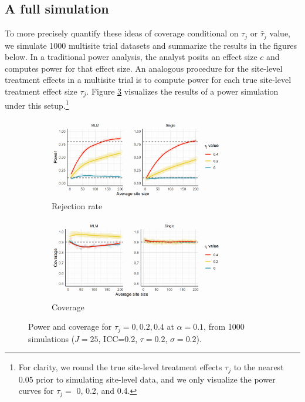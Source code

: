 \documentclass[]{article}
\begin{document}
\subsection{A full simulation}

To more precisely quantify these ideas of coverage conditional on $\tau_j$ or $\hat{\tau}_j$ value, we simulate 1000 multisite trial datasets and summarize the results in the figures below.
In a traditional power analysis, the analyst posits an effect size $c$ and computes power for that effect size.
An analogous procedure for the site-level treatment effects in a multisite trial is to compute power for each true site-level treatment effect size $\tau_j$.
Figure \ref{fig:pcp1} visualizes the results of a power simulation under this setup.\footnote{For clarity, we round the true site-level treatment effects $\tau_j$ to the nearest 0.05 prior to simulating site-level data, and we only visualize the power curves for $\tau_j =$ 0, 0.2, and 0.4.}
\begin{figure}[ht]
    \centering
    \begin{subfigure}[a]{\textwidth}
        \centering
    	\includegraphics[width=0.85\textwidth]{pp1}
        \caption{Rejection rate}
    	\label{fig:pp1}
    \end{subfigure}
    \vfill
    \begin{subfigure}[b]{\textwidth}
        \centering
    	\includegraphics[width=0.85\textwidth]{cp1}
        \caption{Coverage}
    	\label{fig:cp1}
    \end{subfigure}
    \caption{Power and coverage for $\tau_j = 0, 0.2, 0.4$ at $\alpha=0.1$, from 1000 simulations ($J=25$, ICC=0.2, $\tau=0.2$, $\sigma=0.2$).}
    \label{fig:pcp1}
\end{figure}
\end{document}
